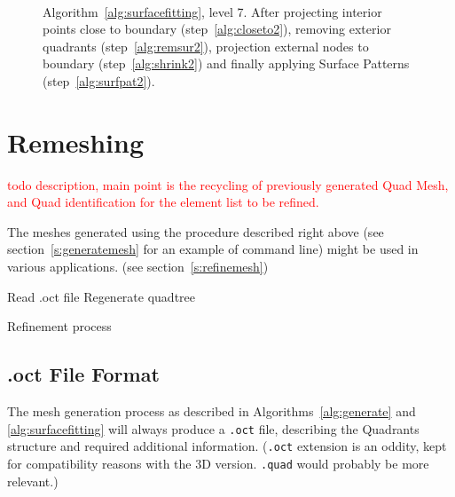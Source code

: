 \documentclass[10pt]{article}
\begin{document}
\begin{figure}[htb]
\centering
 \\
 \caption{Algorithm~\ref{alg:surfacefitting}, level 7. After projecting interior points close to boundary (step~\ref{alg:closeto2}), removing exterior quadrants (step~\ref{alg:remsur2}), projection external nodes to boundary (step~\ref{alg:shrink2}) and finally applying Surface Patterns (step~\ref{alg:surfpat2}).}
\label{fig:surfacehandling7}
\end{figure}



\section{Remeshing}
\label{sec:remeshing}
\textcolor{red}{todo description, main point is the recycling of previously generated Quad Mesh, and Quad identification for the element list to be refined.}

The meshes generated using the procedure described right above (see section~\ref{s:generatemesh} for an example of command line) might be used in various applications.
(see section~\ref{s:refinemesh})

\begin{algorithm}[H]
\SetAlgoLined
{}
\nl Read .oct file\;
\nl Regenerate quadtree\;
 \caption{Refinement process}
 \label{alg:refinement}
\end{algorithm}

\subsection{.oct File Format}
The mesh generation process as described in Algorithms~\ref{alg:generate} and \ref{alg:surfacefitting} will always produce a \texttt{.oct} file, describing the Quadrants structure and required additional information.
(\texttt{.oct} extension is an oddity, kept for compatibility reasons with the 3D version. \texttt{.quad} would probably be more relevant.)
\end{document}
